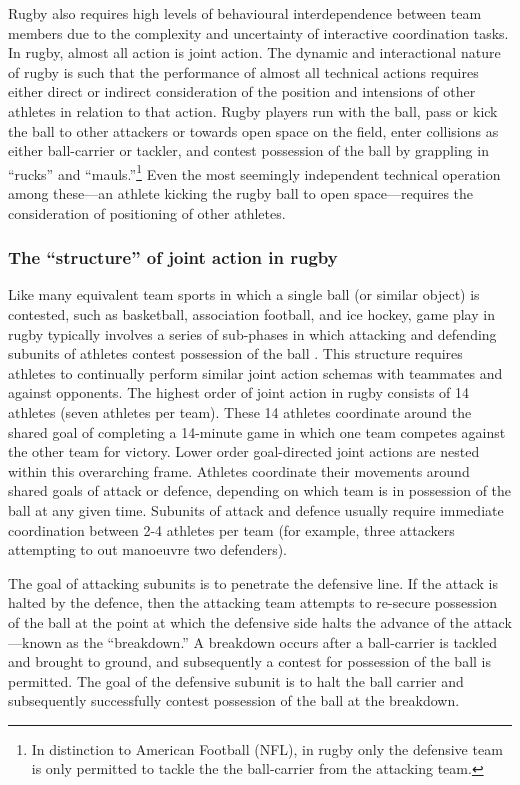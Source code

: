 \begin{CJK}{UTF8}{gbsn}
Rugby also requires high levels of behavioural interdependence between team members due to the complexity and uncertainty of interactive coordination tasks. In rugby, almost all action is joint action.  The dynamic and interactional nature of rugby is such that the performance of almost all technical actions requires either direct or indirect consideration of the position and intensions of other athletes in relation to that action. Rugby players run with the ball, pass or kick the ball to other attackers or towards open space on the field, enter collisions as either ball-carrier or tackler, and contest possession of the ball by grappling in ``rucks'' and ``mauls.''\footnote{In distinction to American Football (NFL), in rugby only the defensive team is only permitted to tackle the the ball-carrier from the attacking team.}  Even the most seemingly independent technical operation among these---an athlete kicking the rugby ball to open space---requires the consideration of positioning of other athletes.


\subsubsection{The ``structure'' of joint action in rugby}
Like many equivalent team sports in which a single ball (or similar object) is contested, such as basketball, association football, and ice hockey, game play in rugby typically involves a series of sub-phases in which attacking and defending subunits of athletes contest possession of the ball \citep{Passos2011}. This structure requires athletes to continually perform similar joint action schemas with teammates and against opponents.   The highest order of joint action in rugby consists of 14 athletes (seven athletes per team).  These 14 athletes coordinate around the shared goal of completing a 14-minute game in which one team competes against the other team for victory.  Lower order goal-directed joint actions are nested within this overarching frame. Athletes coordinate their movements around shared goals of attack or defence, depending on which team is in possession of the ball at any given time.  Subunits of attack and defence usually require immediate coordination between 2-4 athletes per team (for example, three attackers attempting to out manoeuvre two defenders).

The goal of attacking subunits is to penetrate the defensive line. If the attack is halted by the defence, then the attacking team attempts to re-secure possession of the ball at the point at which the defensive side halts the advance of the attack---known as the ``breakdown.''  A breakdown occurs after a ball-carrier is tackled and brought to ground, and subsequently a contest for possession of the ball is permitted.  The goal of the defensive subunit is to halt the ball carrier and subsequently successfully contest possession of the ball at the breakdown.


\end{CJK}
